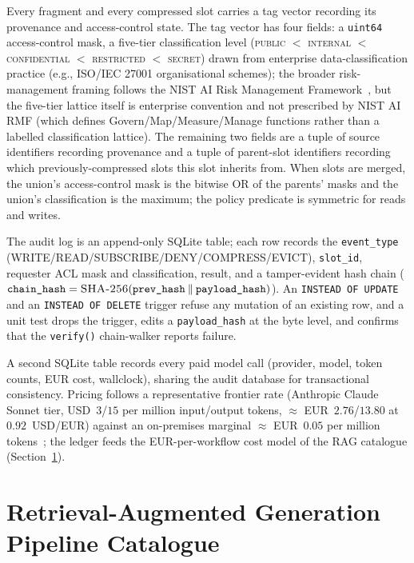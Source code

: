 Every fragment and every compressed slot carries a tag vector
recording its provenance and access-control state. The tag vector has
four fields: a \texttt{uint64} access-control mask, a five-tier
classification level (\textsc{public} $<$ \textsc{internal} $<$
\textsc{confidential} $<$ \textsc{restricted} $<$ \textsc{secret})
drawn from enterprise data-classification practice (e.g., ISO/IEC 27001
organisational schemes); the broader risk-management framing follows
the NIST AI Risk Management
Framework~\cite{nistairmf}, but the five-tier lattice itself is
enterprise convention and not prescribed by NIST AI RMF (which
defines Govern/Map/Measure/Manage functions rather than a
labelled classification lattice). The remaining two fields are a
tuple of source identifiers recording provenance and a tuple of
parent-slot identifiers recording which previously-compressed slots
this slot inherits from. When slots are
merged, the union's access-control mask is the bitwise OR of the
parents' masks and the union's classification is the maximum; the
policy predicate is symmetric for reads and writes.

The audit log is an append-only SQLite table; each row records the
\texttt{event\_type} (WRITE/READ/SUBSCRIBE/DENY/COMPRESS/EVICT),
\texttt{slot\_id}, requester ACL mask and classification, result, and
a tamper-evident hash chain
($\texttt{chain\_hash}=\textsc{SHA-256}(\texttt{prev\_hash}\mathbin\Vert\texttt{payload\_hash})$).
An \texttt{INSTEAD OF UPDATE} and an \texttt{INSTEAD OF DELETE}
trigger refuse any mutation of an existing row, and a unit test drops
the trigger, edits a \texttt{payload\_hash} at the byte level, and
confirms that the \texttt{verify()} chain-walker reports failure.

A second SQLite table records every paid model call (provider,
model, token counts, EUR cost, wallclock), sharing the audit database
for transactional consistency. Pricing follows a representative
frontier rate (Anthropic Claude Sonnet tier, USD~$3$/$15$ per million
input/output tokens, $\approx$
EUR~$2.76$/$13.80$ at $0.92$~USD/EUR) against an on-premises marginal
$\approx$ EUR~$0.05$ per million tokens~\cite{fcgfinancial2026}; the
ledger feeds the EUR-per-workflow cost model of the RAG catalogue
(Section~\ref{sec:rag_pipelines}).

\section{Retrieval-Augmented Generation Pipeline Catalogue}
\label{sec:rag_pipelines}

